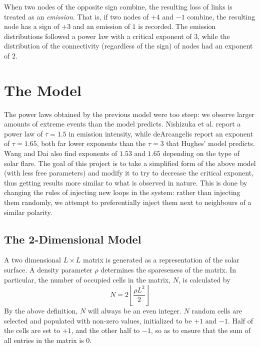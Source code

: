 \documentclass[aps, pre, reprint]{revtex4-2}
\begin{document}
When two nodes of the opposite sign combine, the resulting loss of links is treated as an \textit{emission}. That is, if two nodes of $+4$ and $-1$ combine, the resulting node has a sign of $+3$ and an emission of $1$ is recorded. The emission distributions followed a power law with a critical exponent of $3$, while the distribution of the connectivity (regardless of the sign) of nodes had an exponent of $2$.


\section{The Model}

The power laws obtained by the previous model were too steep: we observe larger amounts of extreme events than the model predicts. Nishizuka et al. \cite{NishizukaXRay} report a power law of $\tau=1.5$ in emission intensity, while deArcangelis \cite{DeArcangelisSolarFlareData} report an exponent of $\tau=1.65$, both far lower exponents than the $\tau=3$ that Hughes' model predicts. Wang and Dai \cite{WangXRayData} also find exponents of $1.53$ and $1.65$ depending on the type of solar flare. The goal of this project is to take a simplified form of the above model (with less free parameters) and modify it to try to decrease the critical exponent, thus getting results more similar to what is observed in nature. This is done by changing the rules of injecting new loops in the system: rather than injecting them randomly, we attempt to preferentially inject them next to neighbours of a similar polarity.


\subsection{The 2-Dimensional Model}

A two dimensional $L\times L$ matrix is generated as a representation of the solar surface. A density parameter $\rho$ determines the spareseness of the matrix. In particular, the number of occupied cells in the matrix, $N$, is calculated by
\begin{equation}
    N = 2\left\lfloor\frac{\rho L^2}{2}\right\rfloor
\end{equation}
By the above definition, $N$ will always be an even integer. $N$ random cells are selected and populated with non-zero values, initialized to be $+1$ and $-1$. Half of the cells are set to $+1$, and the other half to $-1$, so as to ensure that the sum of all entries in the matrix is 0. \\
\end{document}
